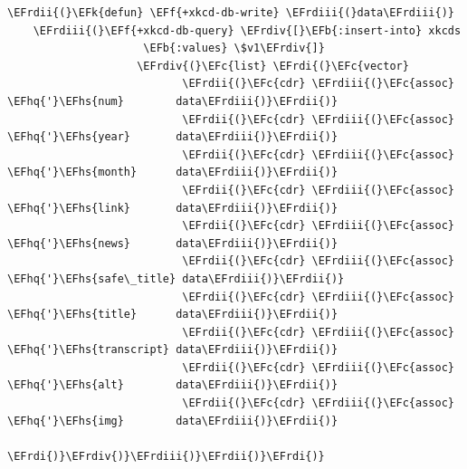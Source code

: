 \documentclass{scrartcl}
\newcommand{\EFk}[1]{\textcolor{EFk}{#1}} %
\newcommand{\EFb}[1]{\textcolor{EFb}{#1}} %
\newcommand{\EFc}[1]{\textcolor{EFc}{#1}} %
\newcommand{\EFf}[1]{\textcolor{EFf}{#1}} %
\newcommand{\EFhq}[1]{\textcolor{EFhq}{#1}} %
\newcommand{\EFhs}[1]{\textcolor{EFhs}{#1}} %
\newcommand{\EFrdi}[1]{\textcolor{EFrdi}{#1}} %
\newcommand{\EFrdii}[1]{\textcolor{EFrdii}{#1}} %
\newcommand{\EFrdiii}[1]{\textcolor{EFrdiii}{#1}} %
\newcommand{\EFrdiv}[1]{\textcolor{EFrdiv}{#1}} %
\begin{document}
\begin{Code}
\begin{Verbatim}[]
  \EFrdii{(}\EFk{defun} \EFf{+xkcd-db-write} \EFrdiii{(}data\EFrdiii{)}
    \EFrdiii{(}\EFf{+xkcd-db-query} \EFrdiv{[}\EFb{:insert-into} xkcds
                     \EFb{:values} \$v1\EFrdiv{]}
                    \EFrdiv{(}\EFc{list} \EFrdi{(}\EFc{vector}
                           \EFrdii{(}\EFc{cdr} \EFrdiii{(}\EFc{assoc} \EFhq{'}\EFhs{num}        data\EFrdiii{)}\EFrdii{)}
                           \EFrdii{(}\EFc{cdr} \EFrdiii{(}\EFc{assoc} \EFhq{'}\EFhs{year}       data\EFrdiii{)}\EFrdii{)}
                           \EFrdii{(}\EFc{cdr} \EFrdiii{(}\EFc{assoc} \EFhq{'}\EFhs{month}      data\EFrdiii{)}\EFrdii{)}
                           \EFrdii{(}\EFc{cdr} \EFrdiii{(}\EFc{assoc} \EFhq{'}\EFhs{link}       data\EFrdiii{)}\EFrdii{)}
                           \EFrdii{(}\EFc{cdr} \EFrdiii{(}\EFc{assoc} \EFhq{'}\EFhs{news}       data\EFrdiii{)}\EFrdii{)}
                           \EFrdii{(}\EFc{cdr} \EFrdiii{(}\EFc{assoc} \EFhq{'}\EFhs{safe\_title} data\EFrdiii{)}\EFrdii{)}
                           \EFrdii{(}\EFc{cdr} \EFrdiii{(}\EFc{assoc} \EFhq{'}\EFhs{title}      data\EFrdiii{)}\EFrdii{)}
                           \EFrdii{(}\EFc{cdr} \EFrdiii{(}\EFc{assoc} \EFhq{'}\EFhs{transcript} data\EFrdiii{)}\EFrdii{)}
                           \EFrdii{(}\EFc{cdr} \EFrdiii{(}\EFc{assoc} \EFhq{'}\EFhs{alt}        data\EFrdiii{)}\EFrdii{)}
                           \EFrdii{(}\EFc{cdr} \EFrdiii{(}\EFc{assoc} \EFhq{'}\EFhs{img}        data\EFrdiii{)}\EFrdii{)}
                           \EFrdi{)}\EFrdiv{)}\EFrdiii{)}\EFrdii{)}\EFrdi{)}
\end{Verbatim}
\end{Code}
\end{document}
